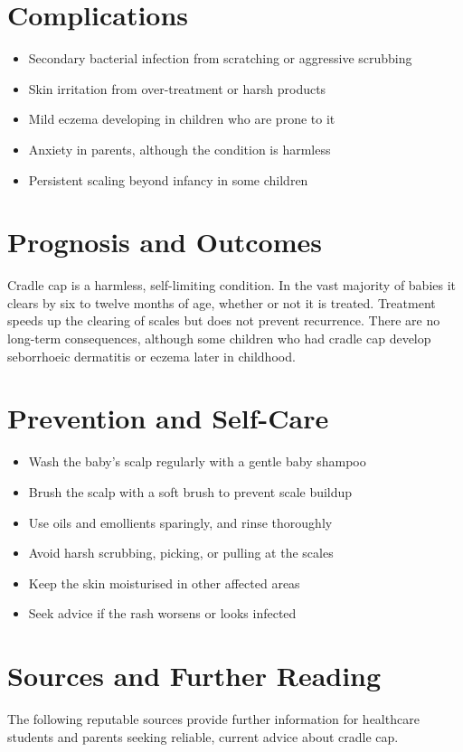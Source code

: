\section*{Complications}
\begin{itemize}
    \item Secondary bacterial infection from scratching or aggressive scrubbing
    \item Skin irritation from over-treatment or harsh products
    \item Mild eczema developing in children who are prone to it
    \item Anxiety in parents, although the condition is harmless
    \item Persistent scaling beyond infancy in some children
\end{itemize}

\section*{Prognosis and Outcomes}
Cradle cap is a harmless, self-limiting condition. In the vast majority of babies it clears by six to twelve months of age, whether or not it is treated. Treatment speeds up the clearing of scales but does not prevent recurrence. There are no long-term consequences, although some children who had cradle cap develop seborrhoeic dermatitis or eczema later in childhood.

\section*{Prevention and Self-Care}
\begin{itemize}
    \item Wash the baby's scalp regularly with a gentle baby shampoo
    \item Brush the scalp with a soft brush to prevent scale buildup
    \item Use oils and emollients sparingly, and rinse thoroughly
    \item Avoid harsh scrubbing, picking, or pulling at the scales
    \item Keep the skin moisturised in other affected areas
    \item Seek advice if the rash worsens or looks infected
\end{itemize}

\section*{Sources and Further Reading}
The following reputable sources provide further information for healthcare students and parents seeking reliable, current advice about cradle cap.

